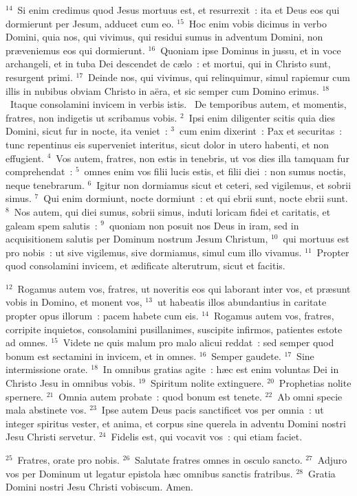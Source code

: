 ${}^{14}$~Si enim credimus quod Jesus mortuus est, et resurrexit~: ita et Deus eos qui dormierunt per Jesum, adducet cum eo.
${}^{15}$~Hoc enim vobis dicimus in verbo Domini, quia nos, qui vivimus, qui residui sumus in adventum Domini, non pr\ae veniemus eos qui dormierunt.
${}^{16}$~Quoniam ipse Dominus in jussu, et in voce archangeli, et in tuba Dei descendet de c\ae lo~: et mortui, qui in Christo sunt, resurgent primi.
${}^{17}$~Deinde nos, qui vivimus, qui relinquimur, simul rapiemur cum illis in nubibus obviam Christo in a\"era, et sic semper cum Domino erimus.
${}^{18}$~Itaque consolamini invicem in verbis istis.
~De temporibus autem, et momentis, fratres, non indigetis ut scribamus vobis.
${}^{2}$~Ipsi enim diligenter scitis quia dies Domini, sicut fur in nocte, ita veniet~:
${}^{3}$~cum enim dixerint~: Pax et securitas~: tunc repentinus eis superveniet interitus, sicut dolor in utero habenti, et non effugient.
${}^{4}$~Vos autem, fratres, non estis in tenebris, ut vos dies illa tamquam fur comprehendat~:
${}^{5}$~omnes enim vos filii lucis estis, et filii diei~: non sumus noctis, neque tenebrarum.
${}^{6}$~Igitur non dormiamus sicut et ceteri, sed vigilemus, et sobrii simus.
${}^{7}$~Qui enim dormiunt, nocte dormiunt~: et qui ebrii sunt, nocte ebrii sunt.
${}^{8}$~Nos autem, qui diei sumus, sobrii simus, induti loricam fidei et caritatis, et galeam spem salutis~:
${}^{9}$~quoniam non posuit nos Deus in iram, sed in acquisitionem salutis per Dominum nostrum Jesum Christum,
${}^{10}$~qui mortuus est pro nobis~: ut sive vigilemus, sive dormiamus, simul cum illo vivamus.
${}^{11}$~Propter quod consolamini invicem, et \ae dificate alterutrum, sicut et facitis.


${}^{12}$~Rogamus autem vos, fratres, ut noveritis eos qui laborant inter vos, et pr\ae sunt vobis in Domino, et monent vos,
${}^{13}$~ut habeatis illos abundantius in caritate propter opus illorum~: pacem habete cum eis.
${}^{14}$~Rogamus autem vos, fratres, corripite inquietos, consolamini pusillanimes, suscipite infirmos, patientes estote ad omnes.
${}^{15}$~Videte ne quis malum pro malo alicui reddat~: sed semper quod bonum est sectamini in invicem, et in omnes.
${}^{16}$~Semper gaudete.
${}^{17}$~Sine intermissione orate.
${}^{18}$~In omnibus gratias agite~: h\ae c est enim voluntas Dei in Christo Jesu in omnibus vobis.
${}^{19}$~Spiritum nolite extinguere.
${}^{20}$~Prophetias nolite spernere.
${}^{21}$~Omnia autem probate~: quod bonum est tenete.
${}^{22}$~Ab omni specie mala abstinete vos.
${}^{23}$~Ipse autem Deus pacis sanctificet vos per omnia~: ut integer spiritus vester, et anima, et corpus sine querela in adventu Domini nostri Jesu Christi servetur.
${}^{24}$~Fidelis est, qui vocavit vos~: qui etiam faciet.


${}^{25}$~Fratres, orate pro nobis.
${}^{26}$~Salutate fratres omnes in osculo sancto.
${}^{27}$~Adjuro vos per Dominum ut legatur epistola h\ae c omnibus sanctis fratribus.
${}^{28}$~Gratia Domini nostri Jesu Christi vobiscum. Amen.
